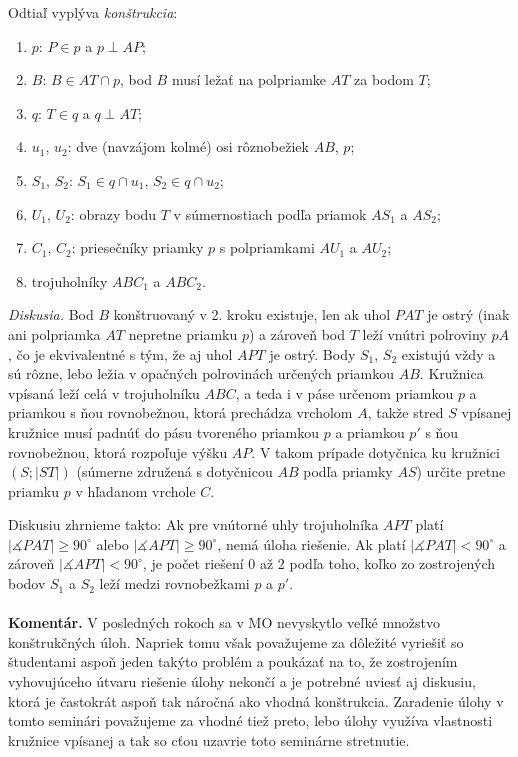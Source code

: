 \documentclass[11pt,a4paper,oneside,final]{book}
\newcommand{\kom}{\textbf{Komentár.} }
\newcommand{\ma}{\measuredangle}
\begin{document}
Odtiaľ vyplýva \textit{konštrukcia}:
\begin{enumerate}
\item $p$: $P \in p$ a $p \perp AP$;
\item $B$: $B \in AT \cap p$, bod $B$ musí ležať na polpriamke $AT$ za bodom $T$;
\item $q$: $T \in q$ a $q \perp AT$;
\item $u_1$, $u_2$: dve (navzájom kolmé) osi rôznobežiek $AB$, $p$;
\item $S_1$, $S_2$: $S_1 \in q \cap u_1$, $S_2 \in q \cap u_2$;
\item $U_1$, $U_2$: obrazy bodu $T$ v súmernostiach podľa priamok $AS_1$ a $AS_2$;
\item $C_1$, $C_2$: priesečníky priamky $p$ s polpriamkami $AU_1$ a $AU_2$;
\item trojuholníky $ABC_1$ a $ABC_2$.
\end{enumerate}
\textit{Diskusia.} Bod $B$ konštruovaný v 2. kroku existuje, len ak uhol $PAT$ je ostrý (inak ani polpriamka $AT$ nepretne priamku $p$) a zároveň bod $T$ leží vnútri polroviny $pA$, čo je ekvivalentné s tým, že aj uhol $APT$ je ostrý. Body $S_1$, $S_2$ existujú vždy a sú rôzne, lebo ležia v opačných polrovinách určených priamkou $AB$. Kružnica vpísaná leží celá v trojuholníku $ABC$, a teda i v páse určenom priamkou $p$ a priamkou s ňou rovnobežnou, ktorá prechádza vrcholom $A$, takže stred $S$ vpísanej kružnice musí padnúť do pásu tvoreného priamkou $p$ a priamkou $p'$ s ňou rovnobežnou, ktorá rozpoľuje výšku $AP$. V takom prípade dotyčnica ku kružnici $(S; |ST|)$ (súmerne združená s dotyčnicou $AB$ podľa priamky $AS$) určite pretne priamku $p$ v hľadanom vrchole $C$.

Diskusiu zhrnieme takto: Ak pre vnútorné uhly trojuholníka $APT$ platí $|\ma PAT| \geq 90^\circ$ alebo $|\ma APT| \geq 90^\circ$, nemá úloha riešenie. Ak platí $|\ma PAT| < 90^\circ$ a zároveň $|\ma APT| < 90^\circ$, je počet riešení 0 až 2 podľa toho, koľko zo zostrojených bodov $S_1$ a $S_2$ leží medzi rovnobežkami $p$ a $p'$.\\
\\
\kom V posledných rokoch sa v MO nevyskytlo veľké množstvo konštrukčných úloh. Napriek tomu však považujeme za dôležité vyriešiť so študentami aspoň jeden takýto problém a poukázať na to, že zostrojením vyhovujúceho útvaru riešenie úlohy nekončí a je potrebné uviesť aj diskusiu, ktorá je častokrát aspoň tak náročná ako vhodná konštrukcia. Zaradenie úlohy v tomto seminári považujeme za vhodné tiež preto, lebo úlohy využíva vlastnosti kružnice vpísanej a tak so cťou uzavrie toto seminárne stretnutie.
\end{document}
